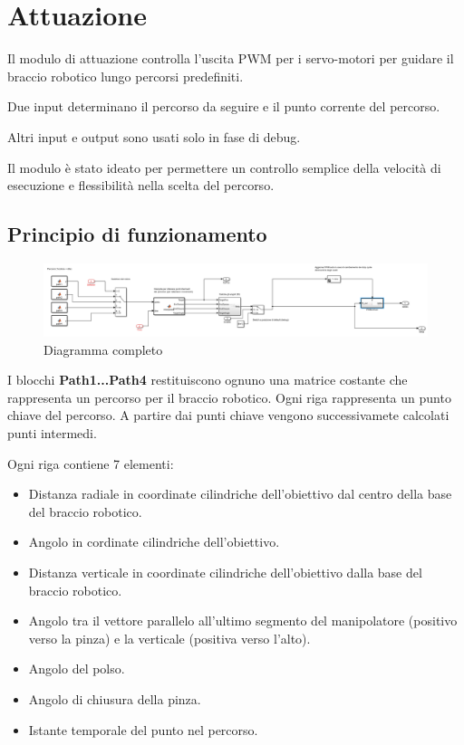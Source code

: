 \documentclass[12pt]{report}
\begin{document}
\chapter{Attuazione}

Il modulo di attuazione controlla l'uscita PWM per i servo-motori per guidare il braccio robotico lungo percorsi predefiniti.

Due input determinano il percorso da seguire e il punto corrente del percorso.

Altri input e output sono usati solo in fase di debug.

Il modulo è stato ideato per permettere un controllo semplice della velocità di esecuzione e flessibilità nella scelta del percorso.

\section{Principio di funzionamento}

\begin{figure}
\includegraphics[width=\textwidth]{Complete_attuation}
\caption{Diagramma completo}
\end{figure}

I blocchi \textbf{Path1...Path4} restituiscono ognuno una matrice costante che rappresenta un percorso per il braccio robotico. Ogni riga rappresenta un punto chiave del percorso. A partire dai punti chiave vengono successivamete calcolati punti intermedi.

Ogni riga contiene 7 elementi:

\begin{itemize}
\item Distanza radiale in coordinate cilindriche dell'obiettivo dal centro della base del braccio robotico.
\item Angolo in cordinate cilindriche dell'obiettivo.
\item Distanza verticale in coordinate cilindriche dell'obiettivo dalla base del braccio robotico.
\item Angolo tra il vettore parallelo all'ultimo segmento del manipolatore (positivo verso la pinza) e la verticale (positiva verso l'alto).
\item Angolo del polso.
\item Angolo di chiusura della pinza.
\item Istante temporale del punto nel percorso.
\end{itemize}
\end{document}
